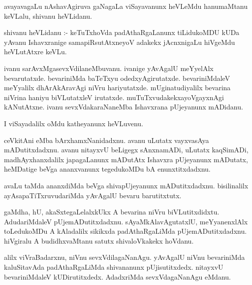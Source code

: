 \documentclass{article}
\begin{document}
\begin{mn}
avayavagaLu  nAshavAgiruva  gaNagaLa  viSayavanunx  heVLeMdu  hanumaMtanu  keVLalu,  shivanu  heVLidanu.
\end{mn}

\begin{mn}
shivanu  heVLidanu :-  keTuTxhoVda  padAthaRgaLanunx  tiLidukoMDU  kUDa  yAvanu  Ishavxranige  samapiRsutAtxneyoV  adakekx  jAcnxnigaLu  
hiVgeMdu  heVLutAtxre  keVLu.
\end{mn}

\begin{mn}
ivanu  sarAvxMgasevxVdilaneMbuvanu.  ivanige  yAvAgalU  meYyelAlx  bevarutatxde.  bevariniMda  baTeTxyu  odedxyAgirutatxde.  
bevariniMdaleV  meYyalilx  dhArAkAravAgi  niVru  hariyutatxde.  mUginatudiyalilx  bevarina  niVrina  haniyu  biVLutatxleV  irutatxde.  
muTuTxvudakekxayoVgayxnAgi  kANutAtxne.  ivanu  sevxVdakaraNaneMba  Ishavxrana  pUjeyanunx  mADidanu.
\end{mn}

\begin{mn}
I  viSayadalilx  oMdu  katheyanunx  heVLuvenu.
\end{mn}

\begin{mn}
ceVkitAni  eMba  bArxhamxNanidadxnu.  avanu  uLutatx  vayxvasAya  mADutitxdadxnu.  avanu  nitayxvU  beLigegx  sAnxnamADi,  uLutatx  kaqSimADi,  
madhAyxhanxdalilx  japagaLanunx  mADutAtx  Ishavxra  pUjeyanunx  mADutatx, heMDatige  beVga  ananxvanunx  tegedukoMDu  bA  enunxtitxdadxnu.
\end{mn}

\begin{mn}
avaLu  taMda  ananxdiMda  beVga  shivapUjeyanunx  mADutitxdadxnu.  bisilinalilx  ayAsapaTiTxruvudariMda  yAvAgalU  bevaru  barutitxtutx.
\end{mn}

\begin{mn}
gaMdha,  hU, akaSxtegaLelalxkUkx  A  bevarina  niVru  biVLutitxdidxtu.  AdudariMdaleV  pUjemADutitxdadxnu.  sAyaMkAlavAgutatxlU,  meYyanenxlAlx  
toLedukoMDu  A  kAladalilx  sikikxda  padAthaRgaLiMda  pUjemADutitxdadxnu.  hiVgiralu  A  budidhxvaMtanu  satutx  shivaloVkakekx  hoVdanu.  
\end{mn}

\begin{mn}
alilx  viVraBadarxnu,  niVnu  sevxVdilagaNanAgu.  yAvAgalU  niVnu  bevariniMda  kaluSitavAda  padAthaRgaLiMda  shivananunx  pUjisutitxdedx.  
nitayxvU  bevariniMdaleV  kUDirutitxdedx.  AdadxriMda  sevxVdagaNanAgu  eMdanu.
\end{mn}
\end{document}
